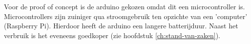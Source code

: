 \chapter{}
\label{ch:corpus}

\section{}
\label{ch:proof-of-concept}

Voor de proof of concept is de arduino gekozen omdat dit een microcontroller is. Microcontrollers zijn zuiniger qua stroomgebruik ten opzichte van een 'computer' (Raspberry Pi). Hierdoor heeft de arduino een langere batterijduur. Naast het verbruik is het eveneens goedkoper (zie hoofdstuk \ref{ch:stand-van-zaken}).

